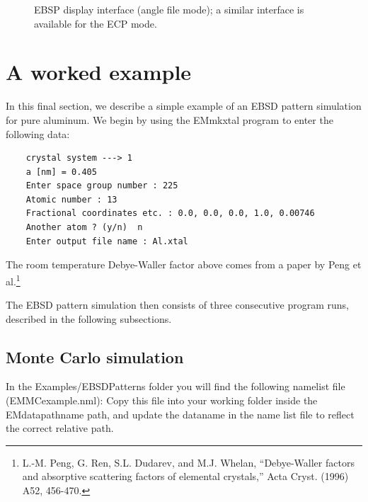 \documentclass[DIV=calc, paper=letter, fontsize=11pt]{scrartcl}	 %
\begin{document}
\begin{figure}[h]
\leavevmode\centering
\epsfxsize=1.8in
\caption{\label{fig:EBSP2}EBSP display interface (angle file mode); a similar interface is available for the ECP mode.}
\end{figure}




\newpage
\section{A worked example\label{sec:examples}}
In this final section, we describe a simple example of an EBSD pattern simulation for pure aluminum.  We begin by using the 
\textsf{EMmkxtal} program to enter the following data:
\begin{verbatim}
	crystal system ---> 1
	a [nm] = 0.405
	Enter space group number : 225
	Atomic number : 13
	Fractional coordinates etc. : 0.0, 0.0, 0.0, 1.0, 0.00746
	Another atom ? (y/n)  n
	Enter output file name : Al.xtal
\end{verbatim}
The room temperature Debye-Waller factor above comes from a paper by Peng et al.\footnote{L.-M. Peng, G. Ren, S.L. Dudarev, and M.J. Whelan,
``Debye-Waller factors and absorptive scattering factors of elemental crystals,'' Acta Cryst. (1996) A52, 456-470.}

The EBSD pattern simulation then consists of three consecutive program runs, described in the following subsections.

\subsection{Monte Carlo simulation}
In the \textsf{Examples/EBSDPatterns} folder you will find the following namelist file (EMMCexample.nml):
Copy this file into your working folder inside the \textsf{EMdatapathname} path, and update the \textsf{dataname}
in the name list file to reflect the correct relative path.
 
\end{document}

